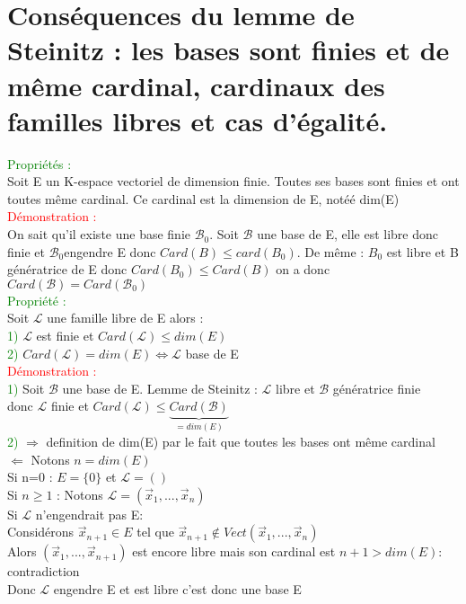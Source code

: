 \documentclass{article}
\begin{document}
\section{Conséquences du lemme de Steinitz : les bases sont finies et de même cardinal, cardinaux des familles libres et cas d'égalité.}
\textcolor{green}{Propriétés :} \\
Soit E un K-espace vectoriel de dimension finie. Toutes ses bases sont finies et ont toutes même cardinal. Ce cardinal est la dimension de E, notéé dim(E) \\
\textcolor{red}{Démonstration :} \\
On sait qu'il existe une base finie $\mathcal B_0$. Soit $\mathcal B$ une base de E, elle est libre donc finie et $ \mathcal B_0$engendre E donc $Card(B) \leq card(B_0)$. De même : $B_0$ est libre et B génératrice de E donc $Card(B_0) \leq Card(B)$ on a donc $Card(\mathcal B)=Card(\mathcal B_0)$\\
\textcolor{green}{Propriété :} \\
Soit $ \mathcal L$ une famille libre de E alors : \\
\textcolor{green}{1)} $\mathcal L$ est finie et $Card(\mathcal L) \leq dim(E)$ \\
\textcolor{green}{2)} $Card(\mathcal L)=dim(E) \Longleftrightarrow \mathcal L$ base de E \\
\textcolor{red}{Démonstration :} \\
\textcolor{green}{1)} Soit $\mathcal B$ une base de E. Lemme de Steinitz : $\mathcal L$ libre et $\mathcal B$ génératrice finie \\
donc $\mathcal L$ finie et $Card(\mathcal L) \leq \underbrace{Card(\mathcal B)}_{=dim(E)}$ \\
\textcolor{green}{2)} $\Rightarrow$ definition de dim(E) par le fait que toutes les bases ont même cardinal \\
$\Leftarrow$ Notons $n=dim(E)$ \\
Si n=0 : $E=\lbrace 0 \rbrace$ et $\mathcal L=()$ \\
Si $n \geq 1$ : Notons $\mathcal L=(\vec x_1,..., \vec x_n)$ \\
Si $\mathcal L$ n'engendrait pas E: \\
Considérons $\vec x_{n+1} \in E$ tel que $\vec x_{n+1} \notin Vect(\vec x_1,...,\vec x_n)$ \\
Alors $(\vec x_1,...,\vec x_{n+1})$ est encore libre mais son cardinal est $n+1> dim(E)$: contradiction \\
Donc $\mathcal L$ engendre E et est libre c'est donc une base E
\end{document}
